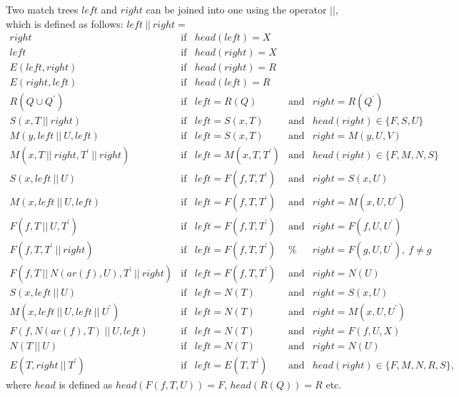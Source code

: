 \documentclass{article}
\begin{document}
Two match trees $left$ and $right$ can be joined into one using the operator 
$||$, which is defined as follows: $left\ ||\ right=$%
\begin{equation*}
\begin{array}{lllll}
right & \text{if} & head(left)=X &  &  \\ 
left & \text{if} & head(right)=X &  &  \\ 
E(left,right) & \text{if} & head(right)=R &  &  \\ 
E(right,left) & \text{if} & head(left)=R &  &  \\ 
R(Q\cup Q^{\prime }) & \text{if} & left=R(Q) & \text{and} & 
right=R(Q^{\prime }) \\ 
S(x,T\ ||\ right) & \text{if} & left=S(x,T) & \text{and} & head(right)\in
\{F,S,U\} \\ 
M(y,left\ ||\ U,left) & \text{if} & left=S(x,T) & \text{and} & right=M(y,U,V)
\\ 
M(x,T\ ||\ right,T^{\prime }\ ||\ right) & \text{if} & left=M(x,T,T^{\prime
}) & \text{and} & head(right)\in \{F,M,N,S\} \\ 
S(x,left\ ||\ U) & \text{if} & left=F(f,T,T^{\prime }) & \text{and} & 
right=S(x,U) \\ 
M(x,left\ ||\ U,left) & \text{if} & left=F(f,T,T^{\prime }) & \text{and} & 
right=M(x,U,U^{\prime }) \\ 
F(f,T\ ||\ U,T^{\prime }) & \text{if} & left=F(f,T,T^{\prime }) & \text{and}
& right=F(f,U,U^{\prime }) \\ 
F(f,T,T^{\prime }\ ||\ right) & \text{if} & left=F(f,T,T^{\prime }) & \text{%
and} & right=F(g,U,U^{\prime }),~f\neq g \\ 
F(f,T\ ||\ N(ar(f),U),T^{\prime }\ ||\ right) & \text{if} & 
left=F(f,T,T^{\prime }) & \text{and} & right=N(U) \\ 
S(x,left\ ||\ U) & \text{if} & left=N(T) & \text{and} & right=S(x,U) \\ 
M(x,left\ ||\ U,left\ ||\ U^{\prime }) & \text{if} & left=N(T) & \text{and}
& right=M(x,U,U^{\prime }) \\ 
F(f,N(ar(f),T)\ ||\ U,left) & \text{if} & left=N(T) & \text{and} & 
right=F(f,U,X) \\ 
N(T\ ||\ U) & \text{if} & left=N(T) & \text{and} & right=N(U) \\ 
E(T,right\ ||\ T^{\prime }) & \text{if} & left=E(T,T^{\prime }) & \text{and}
& head(right)\in \{F,M,N,R,S\},%
\end{array}%
\end{equation*}%
where $head$ is defined as $head(F(f,T,U))=F$, $head(R(Q))=R$ etc.
\end{document}
